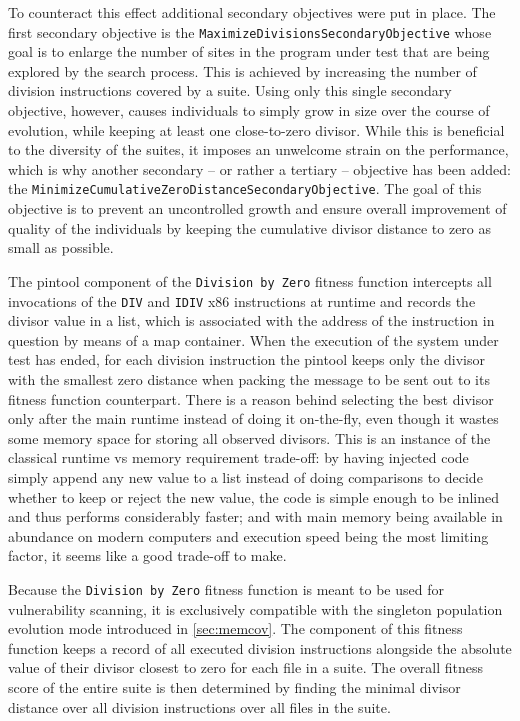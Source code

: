To counteract this effect additional secondary objectives were put in place. The first secondary objective is
the \texttt{MaximizeDivisionsSecondaryObjective} whose goal is to enlarge the number of sites in the
program under test that are being explored by the search process. This is achieved by increasing the number of
division instructions covered by a suite. Using only this single secondary objective, however, causes 
individuals to simply grow in size over the course of evolution, while keeping at least one close-to-zero
divisor. While this is beneficial to the diversity of the suites, it imposes an unwelcome strain on the
performance, which is why another secondary -- or rather a tertiary -- objective has been added: the
\texttt{MinimizeCumulativeZeroDistanceSecondaryObjective}. The goal of this objective is to prevent an
uncontrolled growth and ensure overall improvement of quality of the individuals by keeping the cumulative
divisor distance to zero as small as possible.

The pintool component of the \texttt{Division by Zero} fitness function intercepts all invocations
of the \texttt{DIV} and \texttt{IDIV} x86 instructions at runtime and records the divisor value in a list,
which is associated with the address of the instruction in question by means of a map container. When the
execution of the system under test has ended, for each division instruction the pintool keeps only the divisor
with the smallest zero distance when packing the message to be sent out to its \java fitness function
counterpart.
There is a reason behind selecting the best divisor only after the main runtime instead of doing it on-the-fly,
even though it wastes some memory space for storing all observed divisors. This is an instance of the classical
runtime vs memory requirement trade-off: by having injected code simply append any new value to a list
instead of doing comparisons to decide whether to keep or reject the new value, the code is simple enough to
be inlined and thus performs considerably faster; and with main memory being available in abundance on  modern
computers and execution speed being the most limiting factor, it seems like a good trade-off to make.

Because the \texttt{Division by Zero} fitness function is meant to be used for vulnerability scanning, it is
exclusively compatible with the singleton population evolution mode introduced in \cref{sec:memcov}. The \java
component of this fitness function keeps a record of all executed division instructions alongside the absolute
value of their divisor closest to zero for each file in a suite. The overall fitness score of the entire suite
is then determined by finding the minimal divisor distance over all division instructions over all files in
the suite.

